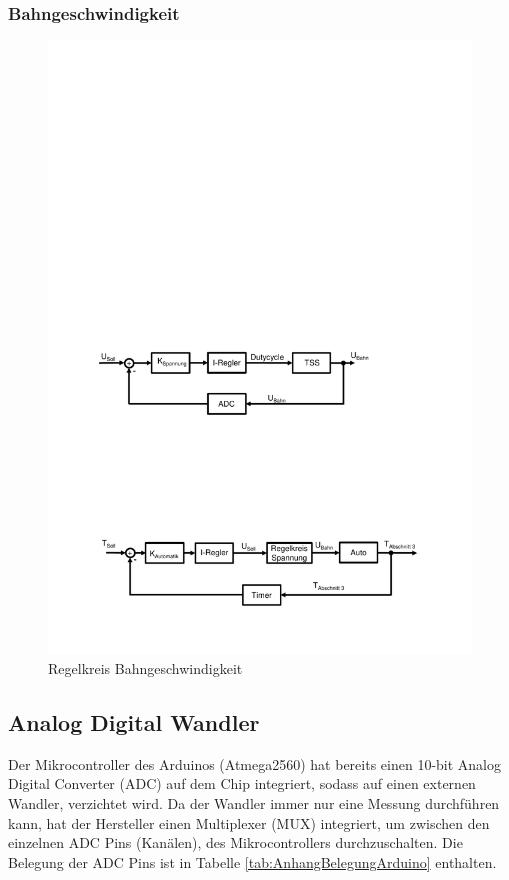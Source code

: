\documentclass[a4paper, 11pt]{report}
\begin{document}
		\subsubsection{Bahngeschwindigkeit}
		\begin{figure}[ht]
			\centering
			\includegraphics[width=\textwidth]{rec/TRegler.pdf}
			\caption{Regelkreis Bahngeschwindigkeit}
			\label{fig:Tcontrol}
		\end{figure}
		\FloatBarrier
	\newpage
	\subsection{Analog Digital Wandler}\label{subsec:ADC}

		Der Mikrocontroller des Arduinos (Atmega2560) hat bereits einen 10-bit Analog Digital Converter (ADC) auf dem Chip integriert, sodass auf einen externen Wandler, verzichtet wird.
		Da der Wandler immer nur eine Messung durchführen kann, hat der Hersteller einen Multiplexer (MUX) integriert, um zwischen den einzelnen ADC Pins (Kanälen), des Mikrocontrollers durchzuschalten.
		Die Belegung der ADC Pins ist in Tabelle \ref{tab:AnhangBelegungArduino} enthalten.
\end{document}
